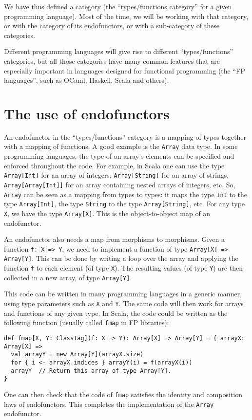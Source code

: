 We have thus defined a category (the \textsf{``}types/functions category\textsf{''}
for a given programming language). Most of the time, we will be working
with that category, or with the category of its endofunctors, or with
a sub-category of these categories.

Different programming languages will give rise to different \textsf{``}types/functions\textsf{''}
categories, but all those categories have many common features that
are especially important in languages designed for functional programming
(the \textsf{``}FP languages\textsf{''}, such as OCaml, Haskell, Scala and others).

\section{The use of endofunctors}

An endofunctor in the \textsf{``}types/functions\textsf{''} category is a mapping
of types together with a mapping of functions. A good example is the
\lstinline!Array! data type. In some programming languages, the type
of an array\textsf{'}s elements can be specified and enforced throughout the
code. For example, in Scala one can use the type \lstinline!Array[Int]!
for an array of integers, \lstinline!Array[String]! for an array
of strings, \lstinline!Array[Array[Int]]! for an array containing
nested arrays of integers, etc. So, \lstinline!Array! can be seen
as a mapping from types to types: it maps the type \lstinline!Int!
to the type \lstinline!Array[Int]!, the type \lstinline!String!
to the type \lstinline!Array[String]!, etc. For any type \lstinline!X!,
we have the type \lstinline!Array[X]!. This is the object-to-object
map of an endofunctor.

An endofunctor also needs a map from morphisms to morphisms. Given
a function \lstinline!f: X => Y!, we need to implement a function
of type \lstinline!Array[X] => Array[Y]!. This can be done by writing
a loop over the array and applying the function \lstinline!f! to
each element (of type \lstinline!X!). The resulting values (of type
\lstinline!Y!) are then collected in a new array, of type \lstinline!Array[Y]!.

This code can be written in many programming languages in a generic
manner, using type parameters such as \lstinline!X! and \lstinline!Y!.
The same code will then work for arrays and functions of any given
type. In Scala, the code could be written as the following function
(usually called \lstinline!fmap! in FP libraries):
\begin{lstlisting}
def fmap[X, Y: ClassTag](f: X => Y): Array[X] => Array[Y] = { arrayX: Array[X] =>
  val arrayY = new Array[Y](arrayX.size)
  for { i <- arrayX.indices } arrayY(i) = f(arrayX(i))
  arrayY  // Return this array of type Array[Y].
}
\end{lstlisting}
One can then check that the code of \lstinline!fmap! satisfies the
identity and composition laws of endofunctors. This completes the
implementation of the \lstinline!Array! endofunctor.

